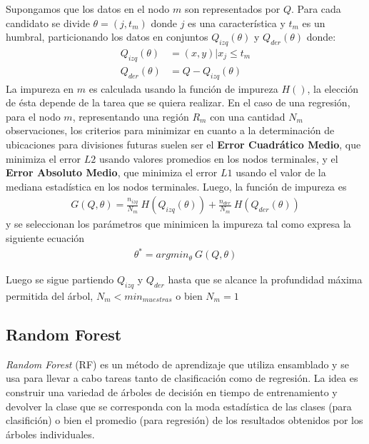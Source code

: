   \par Supongamos que los datos en el nodo $m$ son representados por $Q$. Para cada
    candidato se divide $\theta = (j, t_{m})$ donde $j$ es una característica y
    $t_{m}$ es un humbral, particionando los datos en conjuntos $Q_{izq}(\theta)$ y
    $Q_{der}(\theta)$ donde:
    \begin{align}
      Q_{izq}(\theta) &= (x, y) | x_{j} \leq t_m \\
      Q_{der}(\theta) &= Q - Q_{izq}(\theta)
    \end{align}
    La impureza en $m$ es calculada usando la función de impureza $H()$, la elección
    de ésta depende de la tarea que se quiera realizar.
    En el caso de una regresión, para el nodo $m$, representando una
    región $R_{m}$ con una cantidad $N_{m}$ observaciones, los criterios
    para minimizar en cuanto a la determinación de ubicaciones para divisiones
    futuras suelen ser el \textbf{Error Cuadrático Medio}, que minimiza el error $L2$ usando
    valores promedios en los nodos terminales, y el \textbf{Error Absoluto Medio}, que minimiza
    el error $L1$ usando el valor de la mediana estadística en los nodos terminales.
    Luego, la función de impureza es
    \begin{align}
      G(Q, \theta) = \frac{n_{izq}}{N_{m}} \ H(Q_{izq}(\theta)) + \frac{n_{der}}{N_{m}} \ H(Q_{der}(\theta))
    \end{align}
    y se seleccionan los parámetros que minimicen la impureza tal como expresa la
    siguiente ecuación
    \begin{align}
      \theta^{*} = argmin_{\theta} \ G(Q, \theta)
    \end{align}

    Luego se sigue partiendo $Q_{izq}$ y $Q_{der}$ hasta que se alcance la profundidad
    máxima permitida del árbol, $N_{m} < min_{muestras}$ o bien $N_{m} = 1$


\subsection{Random Forest}

  \par \textit{Random Forest} (RF) es un método de aprendizaje que utiliza ensamblado y se
    usa para llevar a cabo tareas tanto de clasificación como de regresión.
    La idea es construir una variedad de árboles de decisión en tiempo de entrenamiento
    y devolver la clase que se corresponda con la moda estadística de las clases
    (para clasifición) o bien el promedio (para regresión) de los resultados
    obtenidos por los árboles individuales.

